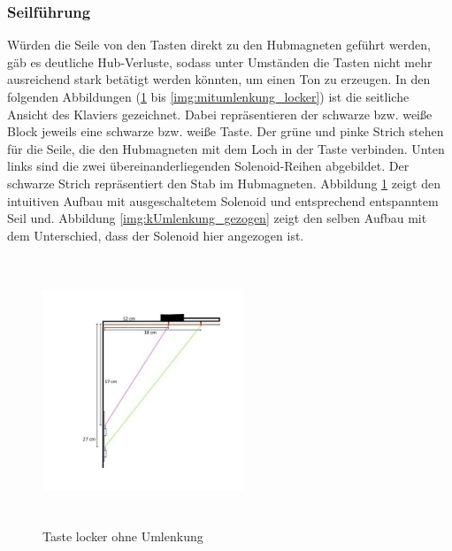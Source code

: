 \subsubsection{Seilführung}

Würden die Seile von den Tasten direkt zu den Hubmagneten geführt werden,
gäb es deutliche Hub-Verluste, sodass unter Umständen die Tasten nicht mehr ausreichend stark betätigt werden könnten, um einen Ton zu erzeugen.
\newline
In den folgenden Abbildungen (\ref{img:kUmlenkung_locker} bis \ref{img:mitumlenkung_locker}) ist die seitliche Ansicht des Klaviers gezeichnet.
Dabei repräsentieren der schwarze bzw. weiße Block jeweils eine schwarze bzw. weiße Taste.
Der grüne und pinke Strich stehen für die Seile, die den Hubmagneten mit dem Loch in der Taste verbinden.
Unten links sind die zwei übereinanderliegenden Solenoid-Reihen abgebildet.
Der schwarze Strich repräsentiert den Stab im Hubmagneten.
\newline
Abbildung \ref{img:kUmlenkung_locker} zeigt den intuitiven Aufbau mit ausgeschaltetem Solenoid und entsprechend entspanntem Seil und.
Abbildung \ref{img:kUmlenkung_gezogen} zeigt den selben Aufbau mit dem Unterschied, dass der Solenoid hier angezogen ist.

\begin{figure}[htbp]
    \centering
    \includegraphics[width=6cm, height=8cm]{img/Umlenkung_locker}
    \caption{Taste locker ohne Umlenkung}
    \label{img:kUmlenkung_locker}
\end{figure}

